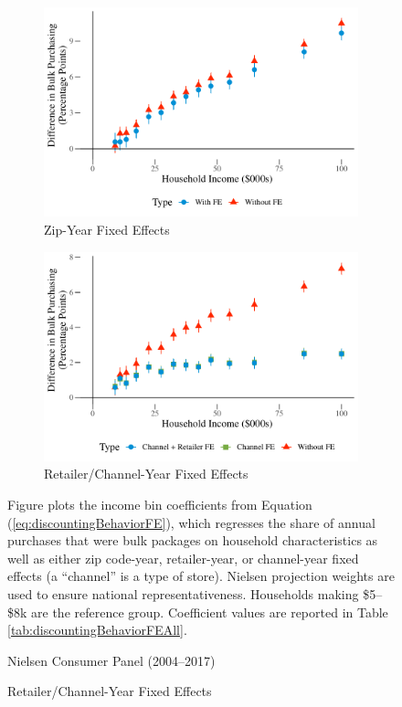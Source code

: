 \documentclass[AER]{AEA_mal}
\begin{document}
\begin{figure}[!htb]
\centering
\caption{Bulk Buying Within Zip Codes or Stores}
 \begin{subfigure}{0.5\textwidth}
 \centering
 \includegraphics[width = 0.9\linewidth]{../5_figures/discountingBehaviorFEZIPColor.pdf}
 \caption{Zip-Year Fixed Effects}
 \end{subfigure}%
 \begin{subfigure}{0.5\textwidth}
 \centering
 \includegraphics[width = 0.9\linewidth]{../5_figures/discountingBehaviorFEColor.pdf}
 \caption{Retailer/Channel-Year Fixed Effects}
 \end{subfigure}
 \begin{figurenotes}
Figure plots the income bin coefficients from Equation (\ref{eq:discountingBehaviorFE}), which regresses the share of annual purchases that were bulk packages on household characteristics as well as either zip code-year, retailer-year, or channel-year fixed effects (a ``channel'' is a type of store). Nielsen projection weights are used to ensure national representativeness. Households making \$5--\$8k are the reference group. Coefficient values are reported in Table \ref{tab:discountingBehaviorFEAll}.
\end{figurenotes}
\begin{figurenotes}[Source]
Nielsen Consumer Panel (2004--2017)
\end{figurenotes}
\label{fig:discountingBehaviorFE}
\end{figure}
\end{document}
